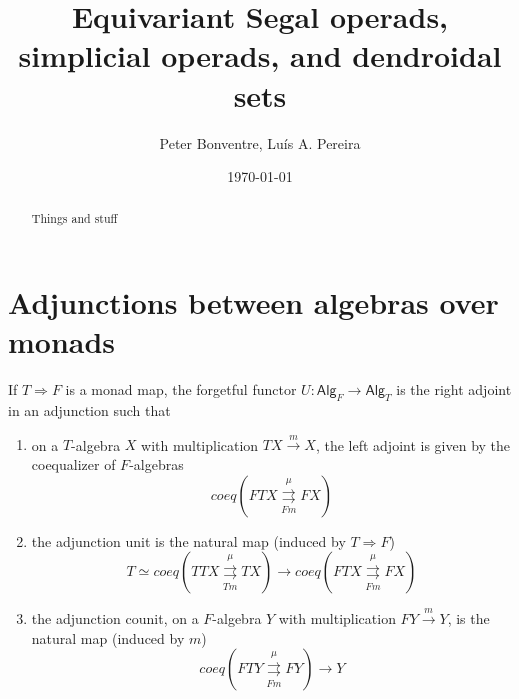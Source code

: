 \documentclass[a4paper,10pt
]{article}%
\title{Equivariant Segal operads, simplicial operads, and dendroidal sets}
\author{Peter Bonventre, Lu\'is A. Pereira}%
\date{\today}
\renewcommand{\1}{\eta}%
\begin{document}
\maketitle

\begin{abstract}
      Things and stuff
\end{abstract}

\tableofcontents



\section{Adjunctions between algebras over monads}




\begin{proposition}
If $T \Rightarrow F$ is a monad map,
the forgetful functor
$U \colon \mathsf{Alg}_F \to \mathsf{Alg}_T$
is the right adjoint in an adjunction such that
\begin{enumerate}[label=(\roman*)]
\item on a $T$-algebra $X$ with multiplication $TX \xrightarrow{m} X$,
the left adjoint is given by the coequalizer of $F$-algebras
\begin{equation}\label{LEFTADJFOR EQ}
coeq \left( F T X 
\overset{\mu}{\underset{Fm}{\rightrightarrows}}
F X\right)
\end{equation}
\item the adjunction unit
is the natural map (induced by $T \Rightarrow F$)
\[
T \simeq coeq \left( T T X 
\overset{\mu}{\underset{Tm}{\rightrightarrows}}
T X\right)
	\to
coeq \left( F T X 
\overset{\mu}{\underset{Fm}{\rightrightarrows}}
F X\right)
\]
\item 
the adjunction counit, on a $F$-algebra $Y$ with multiplication 
$FY \xrightarrow{m} Y$, is the natural map (induced by $m$)
\[
coeq \left( F T Y 
\overset{\mu}{\underset{Fm}{\rightrightarrows}}
F Y\right)
\to
Y
\]
\end{enumerate}
\end{proposition}
\end{document}
